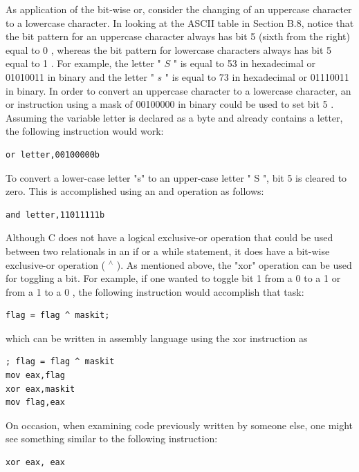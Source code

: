 \documentclass[10pt]{book}
\begin{document}
As application of the bit-wise or, consider the changing of an uppercase character to a lowercase character. In looking at the ASCII table in Section B.8, notice that the bit pattern for an uppercase character always has bit 5 (sixth from the right) equal to 0 , whereas the bit pattern for lowercase characters always has bit 5 equal to 1 . For example, the letter " $S$ " is equal to 53 in hexadecimal or 01010011 in binary and the letter " $s$ " is equal to 73 in hexadecimal or 01110011 in binary. In order to convert an uppercase character to a lowercase character, an or instruction using a mask of 00100000 in binary could be used to set bit 5 . Assuming the variable letter is declared as a byte and already contains a letter, the following instruction would work:

\begin{verbatim}
or letter,00100000b
\end{verbatim}

To convert a lower-case letter "s" to an upper-case letter " S ", bit 5 is cleared to zero. This is accomplished using an and operation as follows:

\begin{verbatim}
and letter,11011111b
\end{verbatim}

Although C does not have a logical exclusive-or operation that could be used between two relationals in an if or a while statement, it does have a bit-wise exclusive-or operation ( ${ }^{\wedge}$ ). As mentioned above, the "xor" operation can be used for toggling a bit. For example, if one wanted to toggle bit 1 from a 0 to a 1 or from a 1 to a 0 , the following instruction would accomplish that task:

\begin{verbatim}
flag = flag ^ maskit;
\end{verbatim}

which can be written in assembly language using the xor instruction as
\begin{verbatim}
; flag = flag ^ maskit
mov eax,flag
xor eax,maskit
mov flag,eax
\end{verbatim}

On occasion, when examining code previously written by someone else, one might see something similar to the following instruction:

\begin{verbatim}
xor eax, eax
\end{verbatim}
\end{document}
